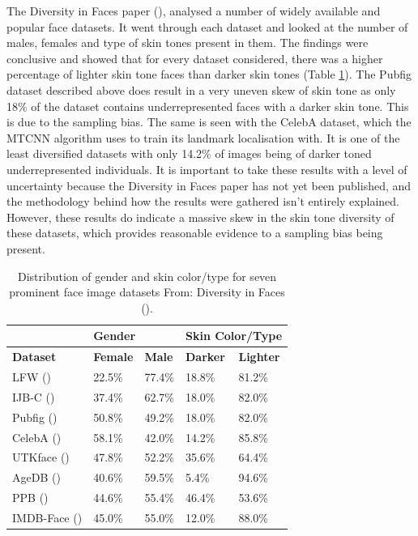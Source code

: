 \documentclass{l4proj}
\begin{document}
The Diversity in Faces paper (\cite{dif}), analysed a number of widely available and popular face datasets. It went through each dataset and looked at the number of males, females and type of skin tones present in them. The findings were conclusive and showed that for every dataset considered, there was a higher percentage of lighter skin tone faces than darker skin tones (Table \ref{diftable}). The Pubfig dataset described above does result in a very uneven skew of skin tone as only 18\% of the dataset contains underrepresented faces with a darker skin tone. This is due to the sampling bias. The same is seen with the CelebA dataset, which the MTCNN algorithm uses to train its landmark localisation with. It is one of the least diversified datasets with only 14.2\% of images being of darker toned underrepresented individuals. It is important to take these results with a level of uncertainty because the Diversity in Faces paper has not yet been published, and the methodology behind how the results were gathered isn't entirely explained. However, these results do indicate a massive skew in the skin tone diversity of these datasets, which provides reasonable evidence to a sampling bias being present.
\begin{table}[h!]
\centering
\begin{minipage}{\textwidth}
\centering
\begin{tabular}{|l|l|l|l|l|}
\hline
\textbf{} & \multicolumn{2}{l|}{\textbf{Gender}} & \multicolumn{2}{l|}{\textbf{Skin Color/Type}} \\ \hline
\textbf{Dataset} & \textbf{Female} & \textbf{Male} & \textbf{Darker} & \textbf{Lighter} \\ \hline
LFW (\cite{300w}) & 22.5\% & 77.4\% & 18.8\% & 81.2\% \\ \hline
IJB-C (\cite{ijb-c}) & 37.4\% & 62.7\% & 18.0\% & 82.0\% \\ \hline
Pubfig (\cite{pubfig}) & 50.8\% & 49.2\% & 18.0\% & 82.0\% \\ \hline
CelebA (\cite{celeba})& 58.1\% & 42.0\% & 14.2\% & 85.8\% \\ \hline
UTKface (\cite{utkface}) & 47.8\% & 52.2\% & 35.6\% & 64.4\% \\ \hline
AgeDB (\cite{agedb}) & 40.6\% & 59.5\% & 5.4\% & 94.6\% \\ \hline
PPB (\cite{gendershades})& 44.6\% & 55.4\% & 46.4\% & 53.6\% \\ \hline
IMDB-Face (\cite{imdb}) & 45.0\% & 55.0\% & 12.0\% & 88.0\% \\ \hline
\end{tabular}
\vspace*{3mm}
\centering
\caption{Distribution of gender and skin color/type for seven prominent face image datasets From: Diversity in Faces (\cite{dif}). }
\label{diftable}
\end{minipage}
\end{table}
\end{document}
